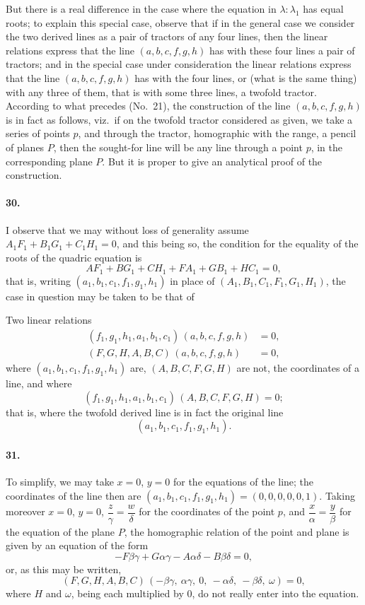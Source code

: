 \documentclass[11pt,a4paper]{article}
\begin{document}
But there is a real difference in the case where the equation in $\lambda : \lambda_1$ has equal
roots; to explain this special case, observe that if in the general case we consider the
two derived lines as a pair of tractors of any four lines, then the linear relations
express that the line $(a,b,c,f,g,h)$ has with these four lines a pair of tractors;
and in the special case under consideration the linear relations express that the line
$(a,b,c,f,g,h)$ has with the four lines, or (what is the same thing) with any three
of them, that is with some three lines, a twofold tractor. According to what precedes
(No.\ 21), the construction of the line $(a,b,c,f,g,h)$ is in fact as follows, viz.\ if on
the twofold tractor considered as given, we take a series of points $p$, and through
the tractor, homographic with the range, a pencil of planes $P$, then the sought-for
line will be any line through a point $p$, in the corresponding plane $P$. But it is
proper to give an analytical proof of the construction.

\paragraph{30.}
I observe that we may without loss of generality assume $A_1 F_1 + B_1 G_1 + C_1 H_1 = 0$,
and this being so, the condition for the equality of the roots of the quadric equation is
\[
AF_1 + BG_1 + CH_1 + FA_1 + GB_1 + HC_1 = 0,
\]
that is, writing $(a_1, b_1, c_1, f_1, g_1, h_1)$ in place of $(A_1, B_1, C_1, F_1, G_1, H_1)$,
the case in question may be taken to be that of

Two linear relations
\begin{align*}
(f_1, g_1, h_1, a_1, b_1, c_1)\,(a,b,c,f,g,h) &= 0, \\
(F, G, H, A, B, C)\,(a,b,c,f,g,h) &= 0,
\end{align*}
where $(a_1, b_1, c_1, f_1, g_1, h_1)$ are, $(A, B, C, F, G, H)$ are not, the coordinates of a
line, and where
\[
(f_1, g_1, h_1, a_1, b_1, c_1)\,(A, B, C, F, G, H) = 0;
\]
that is, where the twofold derived line is in fact the original line
\[
(a_1, b_1, c_1, f_1, g_1, h_1).
\]

\paragraph{31.}
To simplify, we may take $x = 0$, $y = 0$ for the equations of the line; the
coordinates of the line then are $(a_1, b_1, c_1, f_1, g_1, h_1) = (0,0,0,0,0,1)$. Taking
moreover $x = 0$, $y = 0$, $\dfrac{z}{\gamma} = \dfrac{w}{\delta}$ for the coordinates of the point $p$, and
$\dfrac{x}{\alpha} = \dfrac{y}{\beta}$ for the equation of the plane $P$, the homographic relation of the point
and plane is given by an equation of the form
\[
- F\beta\gamma + G\alpha\gamma - A\alpha\delta - B\beta\delta = 0,
\]
or, as this may be written,
\[
(F, G, H, A, B, C)\,(-\beta\gamma,\ \alpha\gamma,\ 0,\ -\alpha\delta,\ -\beta\delta,\ \omega) = 0,
\]
where $H$ and $\omega$, being each multiplied by $0$, do not really enter into the equation.
\end{document}

